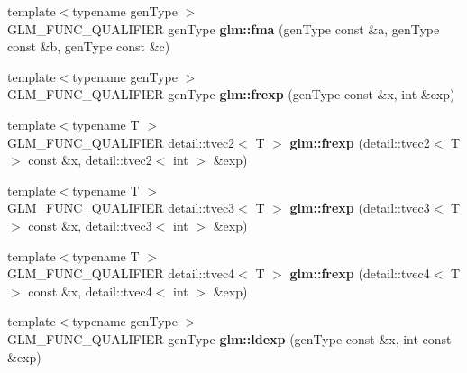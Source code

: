 \begin{DoxyCompactItemize}
\item 
\hypertarget{namespaceglm_a7cb78a977a1f2dbbbd6eecc0910bbd1b}{{\footnotesize template$<$typename gen\-Type $>$ }\\\-G\-L\-M\-\_\-\-F\-U\-N\-C\-\_\-\-Q\-U\-A\-L\-I\-F\-I\-E\-R gen\-Type {\bfseries glm\-::fma} (gen\-Type const \&a, gen\-Type const \&b, gen\-Type const \&c)}\label{namespaceglm_a7cb78a977a1f2dbbbd6eecc0910bbd1b}

\item 
\hypertarget{namespaceglm_a3fab9fc606511c1751ff2173afccaa6e}{{\footnotesize template$<$typename gen\-Type $>$ }\\\-G\-L\-M\-\_\-\-F\-U\-N\-C\-\_\-\-Q\-U\-A\-L\-I\-F\-I\-E\-R gen\-Type {\bfseries glm\-::frexp} (gen\-Type const \&x, int \&exp)}\label{namespaceglm_a3fab9fc606511c1751ff2173afccaa6e}

\item 
\hypertarget{namespaceglm_a2816d346bb147ce8e9d54d5c01acb790}{{\footnotesize template$<$typename T $>$ }\\\-G\-L\-M\-\_\-\-F\-U\-N\-C\-\_\-\-Q\-U\-A\-L\-I\-F\-I\-E\-R \*
detail\-::tvec2$<$ \-T $>$ {\bfseries glm\-::frexp} (detail\-::tvec2$<$ \-T $>$ const \&x, detail\-::tvec2$<$ int $>$ \&exp)}\label{namespaceglm_a2816d346bb147ce8e9d54d5c01acb790}

\item 
\hypertarget{namespaceglm_a228690eed3874fcddef0b74864018a97}{{\footnotesize template$<$typename T $>$ }\\\-G\-L\-M\-\_\-\-F\-U\-N\-C\-\_\-\-Q\-U\-A\-L\-I\-F\-I\-E\-R \*
detail\-::tvec3$<$ \-T $>$ {\bfseries glm\-::frexp} (detail\-::tvec3$<$ \-T $>$ const \&x, detail\-::tvec3$<$ int $>$ \&exp)}\label{namespaceglm_a228690eed3874fcddef0b74864018a97}

\item 
\hypertarget{namespaceglm_a3d5c41a07e38340ad4a30b46c707120c}{{\footnotesize template$<$typename T $>$ }\\\-G\-L\-M\-\_\-\-F\-U\-N\-C\-\_\-\-Q\-U\-A\-L\-I\-F\-I\-E\-R \*
detail\-::tvec4$<$ \-T $>$ {\bfseries glm\-::frexp} (detail\-::tvec4$<$ \-T $>$ const \&x, detail\-::tvec4$<$ int $>$ \&exp)}\label{namespaceglm_a3d5c41a07e38340ad4a30b46c707120c}

\item 
\hypertarget{namespaceglm_a2632eefd82cbdf3ca860c41579a5ef9e}{{\footnotesize template$<$typename gen\-Type $>$ }\\\-G\-L\-M\-\_\-\-F\-U\-N\-C\-\_\-\-Q\-U\-A\-L\-I\-F\-I\-E\-R gen\-Type {\bfseries glm\-::ldexp} (gen\-Type const \&x, int const \&exp)}\label{namespaceglm_a2632eefd82cbdf3ca860c41579a5ef9e}


\end{DoxyCompactItemize}
